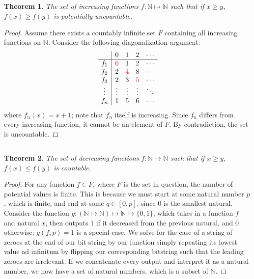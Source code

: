 \documentclass{article}
\newtheorem{theorem}{Theorem}
\newcommand{\N}{\mathbb{N}}
\begin{document}
\subsection{}

\begin{theorem}
    The set of increasing functions \(f: \N \mapsto \N\) such that if \(x \geqslant y\), \(f(x) \geqslant f(y)\) is potentially uncountable.
\end{theorem}
\begin{proof}
    Assume there exists a countably infinite set \(F\) containing all increasing functions on \(\N\).
    Consider the following diagonalization argument:
    \begin{equation}
        \begin{array}{c|cccc}
            & 0 & 1 & 2 & \cdots \\
            \hline
            f_1 & {\color{red} 0} & 1 & 2 & \cdots \\
            f_2 & 2 & {\color{red} 4} & 8 & \cdots \\
            f_3 & 2 & 3 & {\color{red} 5} & \cdots \\
            \vdots & \vdots & \vdots & \vdots & \ddots \\
            f_n & 1 & 5 & 6 & \cdots
        \end{array}
    \end{equation}
    where \(f_n(x) = x + 1\); note that \(f_n\) itself is increasing.
    Since \(f_n\) differs from every increasing function, it cannot be an element of \(F\).
    By contradiction, the set is uncountable.
\end{proof}

\subsection{}

\begin{theorem}
    The set of decreasing functions \(f: \N \mapsto \N\) such that if \(x \geqslant y\), \(f(x) \leqslant f(y)\) is countable.
\end{theorem}
\begin{proof}
    For any function \(f \in F\), where \(F\) is the set in question, the number of potential values is finite.
    This is because we must start at some natural number \(p\), which is finite, and end at some \(q \in [0, p]\), since \(0\) is the smallest natural.
    Consider the function \(g: (\N \mapsto \N) \mapsto \N \mapsto \{0, 1\}\), which takes in a function \(f\) and natural \(x\), then outputs \(1\) if it decreased from the previous natural, and \(0\) otherwise; \(g(f, p) = 1\) is a special case.
    We solve for the case of a string of zeroes at the end of our bit string by our function simply repeating its lowest value ad infinitum by flipping our corresponding bitstring such that the leading zeroes are irrelevant.
    If we concatenate every output and interpret it as a natural number, we now have a set of natural numbers, which is a subset of \(\N\).
\end{proof}
\end{document}
